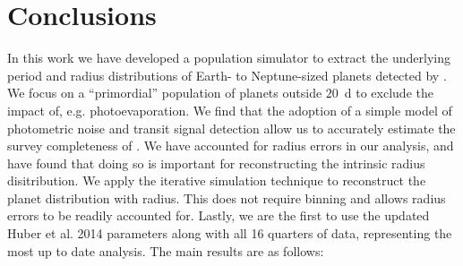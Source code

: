 \section{Conclusions}
In this work we have developed a population simulator to
extract the underlying period and radius distributions of Earth- to Neptune-sized
planets detected by \kep{}. We focus on a ``primordial'' population of
planets outside $20$~d to exclude the impact of, e.g. photoevaporation.
We find that the adoption of a simple model of photometric noise and
transit signal detection allow us to accurately estimate the 
survey completeness of \kep{}.  We have accounted
for radius errors in our analysis, and have found that doing so is
important for reconstructing the intrinsic radius disitribution. We
apply the iterative simulation technique to reconstruct the planet distribution
with radius. This does not require binning and allows radius errors to be
readily accounted for. Lastly, we are the first to use
the updated Huber et al. 2014 parameters along with all 16 quarters of
\kep{} data, representing the most up to date analysis. The main
results are as follows: 
